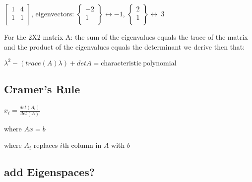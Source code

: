 \documentclass{extarticle}
\begin{document}
$\left[\begin{matrix}1&4\\1&1\\\end{matrix}\right]$, eigenvectors: $\left\{\begin{matrix}-2\\1\\\end{matrix}\right\}\leftrightarrow-1$, $\left\{\begin{matrix}2\\1\\\end{matrix}\right\}\leftrightarrow\ 3$

For the 2X2 matrix A: the sum of the eigenvalues equals the trace of the matrix and the product of the eigenvalues equals the determinant we derive then that:

$\lambda^2-\left(trace\left(A\right)\lambda\right)+detA=\mathrm{characteristic\ polynomial}$






\subsection{Cramer’s Rule}


$x_i=\frac{det(A_i)}{det (A)}$ 

where $Ax=b$

where $A_i$ replaces $i$th column in $A$ with $b$


\begin{tcolorbox}[enhanced jigsaw,sharp corners,coltext=black,colback=Red!25!white,boxrule=0pt,breakable,size=minimal]
\subsection{add Eigenspaces?}
\end{tcolorbox}
\end{document}

